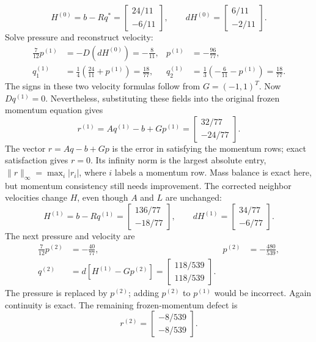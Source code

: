 \[
H^{(0)}=b-Rq^*=\begin{bmatrix}24/11\\-6/11\end{bmatrix},\qquad
dH^{(0)}=\begin{bmatrix}6/11\\-2/11\end{bmatrix}.
\]
Solve pressure and reconstruct velocity:
\begin{align*}
\frac{7}{12}p^{(1)}&=-D(dH^{(0)})=-\frac{8}{11},&p^{(1)}&=-\frac{96}{77},\\
q_1^{(1)}&=\frac14\left(\frac{24}{11}+p^{(1)}\right)=\frac{18}{77},&
q_2^{(1)}&=\frac13\left(-\frac{6}{11}-p^{(1)}\right)=\frac{18}{77}.
\end{align*}
The signs in these two velocity formulas follow from $G=(-1,1)^T$. Now $Dq^{(1)}=0$. Nevertheless, substituting these fields into the original frozen momentum equation gives
\[
r^{(1)}=Aq^{(1)}-b+Gp^{(1)}
=\begin{bmatrix}32/77\\-24/77\end{bmatrix}.
\]
The vector $r=Aq-b+Gp$ is the error in satisfying the momentum rows; exact satisfaction gives $r=0$. Its infinity norm is the largest absolute entry, $\|r\|_\infty=\max_i|r_i|$, where $i$ labels a momentum row. Mass balance is exact here, but momentum consistency still needs improvement.
\newpage
{}
The corrected neighbor velocities change $H$, even though $A$ and $L$ are unchanged:
\[
H^{(1)}=b-Rq^{(1)}=\begin{bmatrix}136/77\\-18/77\end{bmatrix},\qquad
dH^{(1)}=\begin{bmatrix}34/77\\-6/77\end{bmatrix}.
\]
The next pressure and velocity are
\begin{align*}
\frac{7}{12}p^{(2)}&=-\frac{40}{77},&p^{(2)}&=-\frac{480}{539},\\
q^{(2)}&=d\left[H^{(1)}-Gp^{(2)}\right]
=\begin{bmatrix}118/539\\118/539\end{bmatrix}.
\end{align*}
The pressure is replaced by $p^{(2)}$; adding $p^{(2)}$ to $p^{(1)}$ would be incorrect. Again continuity is exact. The remaining frozen-momentum defect is
\[
r^{(2)}=\begin{bmatrix}-8/539\\-8/539\end{bmatrix}.
\]
